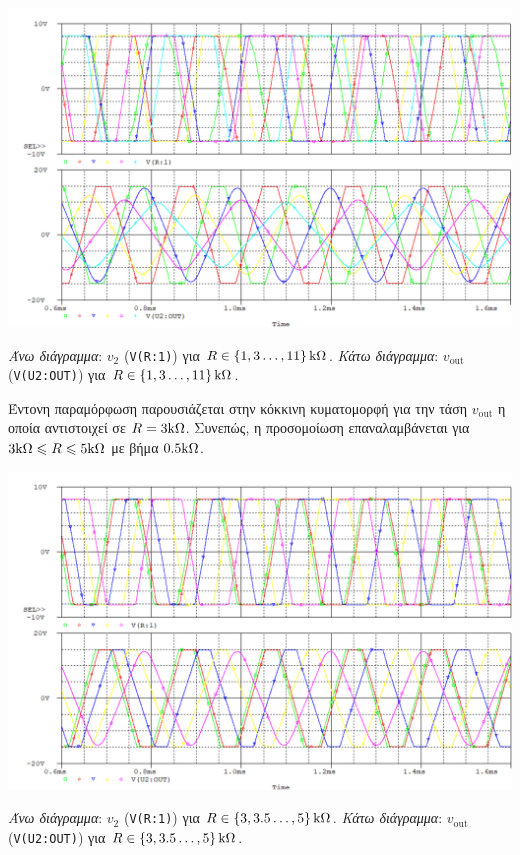 \begin{plot_fig}[H]
	\begin{center}
		\includegraphics[width=13.5cm]{spice_01/1.6 b}
		\caption{\textsl{Άνω διάγραμμα}: $v_2$ (\texttt{V(R:1)}) για $R\in\left\{1,3\ldots,11\right\}\kohm$. \textsl{Κάτω διάγραμμα}: $v_{\mathrm{out}}$ (\texttt{V(U2:OUT)}) για $R\in\left\{1,3\ldots,11\right\}\kohm$.}
		\label{plot:ask1:q6_2}
	\end{center}
\end{plot_fig}

Έντονη παραμόρφωση παρουσιάζεται στην κόκκινη κυματομορφή για την τάση $v_{\mathrm{out}}$ η οποία αντιστοιχεί σε $R=3\kohm$. Συνεπώς, η προσομοίωση επαναλαμβάνεται για $3\kohm\leqslant R\leqslant 5\kohm$ με βήμα $0.5\kohm$.

\begin{plot_fig}[H]
	\begin{center}
		\includegraphics[width=13.5cm]{spice_01/1.6 c}
		\caption{\textsl{Άνω διάγραμμα}: $v_2$ (\texttt{V(R:1)}) για $R\in\left\{3,3.5\ldots,5\right\}\kohm$. \textsl{Κάτω διάγραμμα}: $v_{\mathrm{out}}$ (\texttt{V(U2:OUT)}) για $R\in\left\{3,3.5\ldots,5\right\}\kohm$.}
		\label{plot:ask1:q6_3}
	\end{center}
\end{plot_fig}

